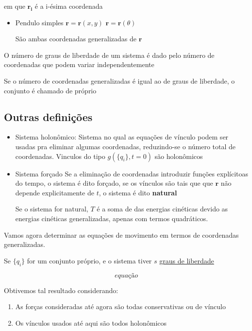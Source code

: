 \documentclass[11pt]{article}
\begin{document}
em que \(\mathbf{r_i}\) é a i-ésima coordenada

\begin{itemize}
\item Pendulo simples
\(\mathbf{r} = \mathbf{r}(x,y)\)
\(\mathbf{r} = \mathbf{r}(\theta)\)

São ambas coordenadas generalizadas de \(\mathbf{r}\)
\end{itemize}

O número de graus de liberdade de um sistema é dado pelo número de
coordenadas que podem variar independentemente

Se o número de coordenadas generalizadas é igual ao de graus de liberdade, o
conjunto é chamado de próprio
\subsection{Outras definições}
\label{sec:orgef04453}
\begin{itemize}
\item Sistema holonômico:
Sistema no qual as equações de vínculo podem ser usadas pra eliminar
algumas coordenadas, reduzindo-se o número total de coordenadas. Vinculos
do tipo \(g(\{q_i\},t = 0)\) são holonômicos
\item Sistema forçado
Se a eliminação de coordenadas introduzir funções explícitoas do tempo, o
sistema é dito forçado, se os vínculos são tais que que \(\mathbf{r}\)
não depende explicitamente de \(t\), o sistema é dito \textbf{natural}

Se o sistema for natural, \(T\) é a soma de das energias cinéticas devido as
energias cinéticas generalizadas, apenas com termos quadráticos.
\end{itemize}

Vamos agora determinar as equações de movimento em termos de coordenadas
generalizadas.

Se \(\{q_i\}\) for um conjunto próprio, e o sistema tiver \(s\) \uline{graus de liberdade}

  \begin{equation}
equação
  \end{equation}

Obtivemos tal resultado considerando:
\begin{enumerate}
\item As forças consideradas até agora são todas conservativas ou de vínculo
\item Os vínculos usados até aqui são todos holonômicos
\end{enumerate}
\end{document}
